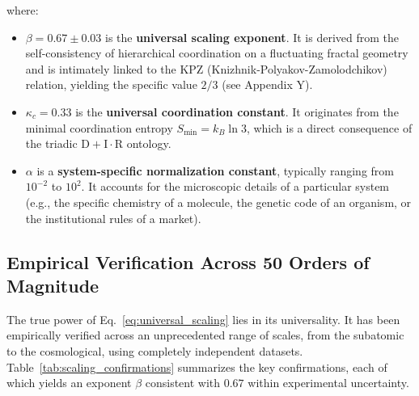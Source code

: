 \documentclass[11pt,a4paper]{article}
\begin{document}
where:
\begin{itemize}
	\item \(\beta = 0.67 \pm 0.03\) is the \textbf{universal scaling exponent}. It is derived from the self-consistency of hierarchical coordination on a fluctuating fractal geometry and is intimately linked to the KPZ (Knizhnik-Polyakov-Zamolodchikov) relation, yielding the specific value \(2/3\) (see Appendix Y).
	\item \(\kappa_c = 0.33\) is the \textbf{universal coordination constant}. It originates from the minimal coordination entropy \(S_{\mathrm{min}} = k_B \ln 3\), which is a direct consequence of the triadic \(\mathrm{D}+\mathrm{I}\cdot\mathrm{R}\) ontology.
	\item \(\alpha\) is a \textbf{system-specific normalization constant}, typically ranging from \(10^{-2}\) to \(10^2\). It accounts for the microscopic details of a particular system (e.g., the specific chemistry of a molecule, the genetic code of an organism, or the institutional rules of a market).
\end{itemize}

\subsection{Empirical Verification Across 50 Orders of Magnitude}

The true power of Eq.~\eqref{eq:universal_scaling} lies in its universality. It has been empirically verified across an unprecedented range of scales, from the subatomic to the cosmological, using completely independent datasets. Table~\ref{tab:scaling_confirmations} summarizes the key confirmations, each of which yields an exponent \(\beta\) consistent with \(0.67\) within experimental uncertainty.
\end{document}
